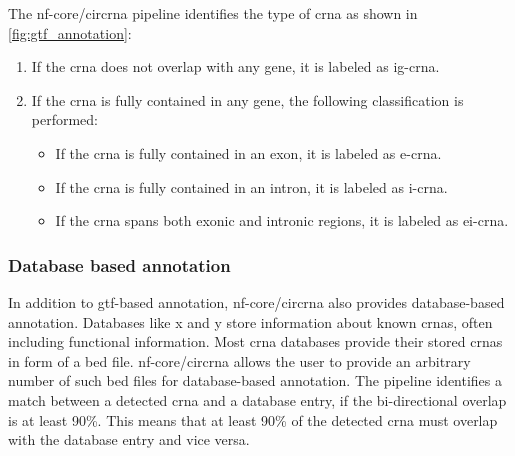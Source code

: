 The nf-core/circrna pipeline identifies the type of \gls{crna} as shown in
\cref{fig:gtf_annotation}: \begin{enumerate} \item If the \gls{crna} does not
          overlap with any gene, it is labeled as \gls{ig-crna}.
    \item If the \gls{crna} is fully contained in any gene, the following
          classification is performed:
          \begin{itemize}
              \item If the \gls{crna} is fully contained in an exon, it is
                    labeled as \gls{e-crna}.
              \item If the \gls{crna} is fully contained in an intron, it is
                    labeled as \gls{i-crna}.
              \item If the \gls{crna} spans both exonic and intronic regions,
                    it is labeled as \gls{ei-crna}.
          \end{itemize}
\end{enumerate}

\subsubsection{Database based annotation}
In addition to \gls{gtf}-based annotation, nf-core/circrna also provides
database-based annotation.
Databases like x and y store information about known \gls{crna}s, often
including functional information.
Most \gls{crna} databases provide their stored \gls{crna}s in form of a
\gls{bed} file.
nf-core/circrna allows the user to provide an arbitrary number of such
\gls{bed}
files for database-based annotation.
The pipeline identifies a match between a detected \gls{crna} and a database
entry, if the bi-directional overlap is at least 90\%.
This means that at least 90\% of the detected \gls{crna} must overlap with the
database entry and vice versa.
